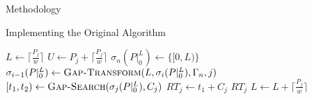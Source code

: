 \documentclass{article}
\begin{document}
\begin{section}{Methodology}
  \begin{subsection}{Implementing the Original Algorithm}
    \begin{algorithm}[H]
      \caption{Gap-Enumeration Algorithm\autocite[11]{BelwalCheng}}\label{gapenum1}
      \begin{algorithmic}[1]
          \State $L \gets \lceil\frac{P_{j}}{w}\rceil$
          \State $U \gets P_{j} + \lceil\frac{P_{j}}{w}\rceil$
            \State $\sigma_{n}(P|_{0}^{L}) \gets \{[0,L)\}$
              \State $\sigma_{i-1}(P|_{0}^{L}) \gets \Call{Gap-Transform}{L, \sigma_{i}(P|_{0}^{L}), \Gamma_{n}, j}$
                \State {}
              \EndIf
            \EndFor
            \State $[t_{1},t_{2}) \gets \Call{Gap-Search}{\sigma_{j}(P|_{0}^{L}), C_{j}}$
              \State $RT_{j} \gets t_{1} + C_{j}$
            \EndIf
              \State \Return $RT_{j}$
            \EndIf
            \State $L \gets L + \lceil\frac{P_{j}}{w}\rceil$
          \EndWhile
        \State {}
      \EndFunction
      \end{algorithmic}
    \end{algorithm}


\end{subsection}
\end{section}
\end{document}
